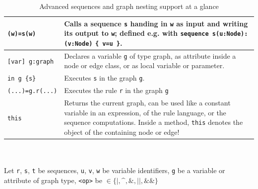 \begin{table}[htbp]
\begin{minipage}{\linewidth}
\begin{tabularx}{\linewidth}{|lX|}
\hline
\texttt{(w)=s(w)} & Calls a sequence \texttt{s} handing in \texttt{w} as input and writing its output to \texttt{w}; defined e.g. with \texttt{sequence s(u:Node):(v:Node)} \texttt{\{ v=u \}}.\\
\hline
\hline
\texttt{[var] g:graph}	& Declares a variable \texttt{g} of type graph, as attribute inside a node or edge class, or as local variable or parameter.\\
\hline
\texttt{in g \{s\}}	& Executes \texttt{s} in the graph \texttt{g}.\\
\hline
\texttt{(...)=g.r(...)} & Executes the rule \texttt{r} in the graph \texttt{g}\\
\hline
\texttt{this} & Returns the current graph, can be used like a constant variable in an expression, of the rule language, or the sequence computations. Inside a method, \texttt{this} denotes the object of the containing node or edge!\\
\hline
\end{tabularx}\indexmain{\texttt{<>}}\indexmain{\texttt{<<;>>}}
\end{minipage}\\
\\ 
{\small Let \texttt{r}, \texttt{s}, \texttt{t} be sequences, \texttt{u}, \texttt{v}, \texttt{w} be variable identifiers, \texttt{g} be a variable or attribute of graph type, \texttt{<op>} be $\in \{\texttt{|}, \texttt{\textasciicircum}, \texttt{\&}, \texttt{||}, \texttt{\&\&}\}$ }%
\caption{Advanced sequences and graph nesting support at a glance}
\label{seqtab}
\end{table}
 
